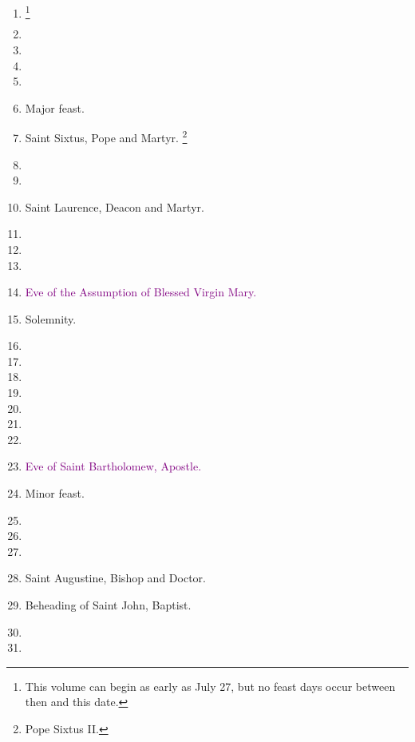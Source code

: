 		\begin{enumerate}
			\item \footnote{This volume can begin as early as July 27, but no feast days occur between then and this date.} %
			\item %
			\item %
			\item %
			\item %
			\item {} Major feast.
			\item Saint Sixtus, Pope and Martyr.  \footnote{Pope Sixtus II.}
			\item %
			\item %
			\item Saint Laurence, Deacon and Martyr. 
			\item %
			\item %
			\item %
			\item \textcolor{purple}{Eve of the Assumption of Blessed Virgin Mary.}
			\item {} Solemnity.
			\item %
			\item %
			\item %
			\item %
			\item %
			\item %
			\item %
			\item \textcolor{purple}{Eve of Saint Bartholomew, Apostle.}
			\item {} Minor feast.
			\item %
			\item %
			\item %
			\item Saint Augustine, Bishop and Doctor. 
			\item Beheading of Saint John, Baptist. 
			\item %
			\item %
		\end{enumerate}

	
